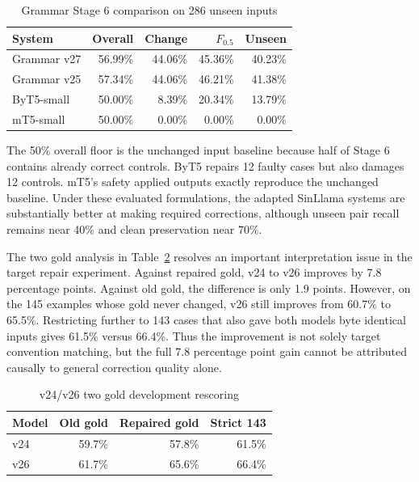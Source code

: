 \documentclass[a4paper,conference]{IEEEtran}
\begin{document}
\begin{table}[!t]
\caption{Grammar Stage 6 comparison on 286 unseen inputs}
\label{tab:grammar}
\centering
\footnotesize
\setlength{\tabcolsep}{1.6pt}
\renewcommand{\arraystretch}{1.04}
\begin{tabular}{|l|r|r|r|r|}
\hline
\textbf{System} & \textbf{Overall} & \textbf{Change} & \textbf{$F_{0.5}$} & \textbf{Unseen} \\
\hline
Grammar v27 & 56.99\% & 44.06\% & 45.36\% & 40.23\% \\
\hline
Grammar v25 & 57.34\% & 44.06\% & 46.21\% & 41.38\% \\
\hline
ByT5-small & 50.00\% & 8.39\% & 20.34\% & 13.79\% \\
\hline
mT5-small & 50.00\% & 0.00\% & 0.00\% & 0.00\% \\
\hline
\end{tabular}
\end{table}

The 50\% overall floor is the unchanged input baseline because half of Stage 6
contains already correct controls. ByT5 repairs 12 faulty cases but also damages
12 controls. mT5's safety applied outputs exactly reproduce the unchanged
baseline. Under these evaluated formulations, the adapted SinLlama systems are
substantially better at making required corrections, although unseen pair
recall remains near 40\% and clean preservation near 70\%.

The two gold analysis in Table~\ref{tab:gdual} resolves an important
interpretation issue in the target repair experiment. Against repaired gold,
v24 to v26 improves by 7.8 percentage points. Against old gold, the difference
is only 1.9 points. However, on the 145 examples whose gold never changed, v26
still improves from 60.7\% to 65.5\%. Restricting further to 143 cases that also
gave both models byte identical inputs gives 61.5\% versus 66.4\%. Thus the
improvement is not solely target convention matching, but the full 7.8 percentage point
gain cannot be attributed causally to general correction quality alone.

\begin{table}[!t]
\caption{v24/v26 two gold development rescoring}
\label{tab:gdual}
\centering
\footnotesize
\setlength{\tabcolsep}{3pt}
\renewcommand{\arraystretch}{1.03}
\begin{tabular}{|l|r|r|r|}
\hline
\textbf{Model} & \textbf{Old gold} & \textbf{Repaired gold} & \textbf{Strict 143} \\
\hline
v24 & 59.7\% & 57.8\% & 61.5\% \\
\hline
v26 & 61.7\% & 65.6\% & 66.4\% \\
\hline
\end{tabular}
\end{table}
\end{document}
